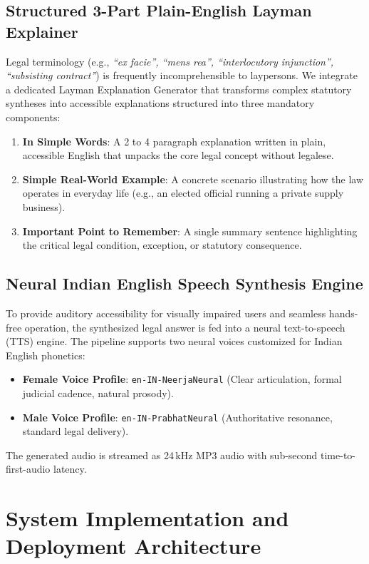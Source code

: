 \documentclass{llncs}
\begin{document}
\subsection{Structured 3-Part Plain-English Layman Explainer}
Legal terminology (e.g., \textit{``ex facie'', ``mens rea'', ``interlocutory injunction'', ``subsisting contract''}) is frequently incomprehensible to laypersons. We integrate a dedicated Layman Explanation Generator that transforms complex statutory syntheses into accessible explanations structured into three mandatory components:
\begin{enumerate}
    \item \textbf{In Simple Words}: A 2 to 4 paragraph explanation written in plain, accessible English that unpacks the core legal concept without legalese.
    \item \textbf{Simple Real-World Example}: A concrete scenario illustrating how the law operates in everyday life (e.g., an elected official running a private supply business).
    \item \textbf{Important Point to Remember}: A single summary sentence highlighting the critical legal condition, exception, or statutory consequence.
\end{enumerate}

\subsection{Neural Indian English Speech Synthesis Engine}
To provide auditory accessibility for visually impaired users and seamless hands-free operation, the synthesized legal answer is fed into a neural text-to-speech (TTS) engine. The pipeline supports two neural voices customized for Indian English phonetics:
\begin{itemize}
    \item \textbf{Female Voice Profile}: \texttt{en-IN-NeerjaNeural} (Clear articulation, formal judicial cadence, natural prosody).
    \item \textbf{Male Voice Profile}: \texttt{en-IN-PrabhatNeural} (Authoritative resonance, standard legal delivery).
\end{itemize}
The generated audio is streamed as 24\,kHz MP3 audio with sub-second time-to-first-audio latency.


\section{System Implementation and Deployment Architecture}
\label{sec:implementation}
\end{document}
